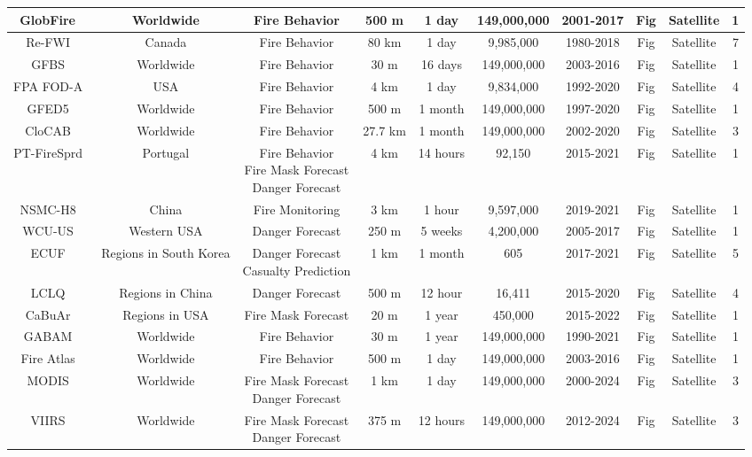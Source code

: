 \documentclass[11pt]{article}
\begin{document}
\begin{table}[htbp]
{\begin{tabular}{c|ccccccccc}
GlobFire~ & Worldwide & Fire Behavior & 500 m & 1 day & 149,000,000 & 2001-2017 & Fig & Satellite & 1 \\ \hline
Re-FWI~ & Canada & Fire Behavior & 80 km & 1 day & 9,985,000 & 1980-2018 &   Fig & Satellite & 7 \\ \hline
GFBS~ & Worldwide & Fire Behavior & 30 m & 16 days & 149,000,000 & 2003-2016 & Fig & Satellite & 1 \\ \hline
FPA FOD-A~ & USA & Fire Behavior & 4 km & 1 day & 9,834,000 & 1992-2020 &   Fig & Satellite & 4 \\ \hline
GFED5~ & Worldwide & Fire Behavior & 500 m & 1 month & 149,000,000 & 1997-2020 & Fig & Satellite & 1 \\ \hline
CloCAB~ & Worldwide & Fire Behavior & 27.7 km & 1 month & 149,000,000 & 2002-2020 & Fig & Satellite & 3 \\ \hline
PT-FireSprd~ & Portugal & \makecell{Fire Behavior\\ Fire Mask Forecast\\ Danger Forecast} & 4 km & 14 hours & 92,150 & 2015-2021 & Fig & Satellite & 1 \\ \hline
NSMC-H8~ & China & Fire Monitoring & 3 km & 1 hour & 9,597,000 & 2019-2021 & Fig & Satellite & 1 \\ \hline
WCU-US~ & Western USA & Danger Forecast & 250 m & 5 weeks & 4,200,000 & 2005-2017 & Fig & Satellite & 1 \\ \hline
ECUF~ & Regions in South Korea & \makecell{Danger Forecast\\ Casualty Prediction} & 1 km & 1 month & 605 & 2017-2021 &   Fig & Satellite & 5 \\ \hline
LCLQ~ & Regions in China & Danger Forecast & 500 m & 12 hour & 16,411 & 2015-2020 &   Fig & Satellite & 4 \\ \hline
CaBuAr~ & Regions in USA & Fire Mask Forecast & 20 m & 1 year & 450,000 & 2015-2022 & Fig & Satellite & 1 \\ \hline
GABAM~ & Worldwide & Fire Behavior & 30 m & 1 year & 149,000,000 & 1990-2021 & Fig & Satellite & 1 \\ \hline
Fire Atlas~ & Worldwide & Fire Behavior & 500 m & 1 day & 149,000,000 & 2003-2016 & Fig & Satellite & 1 \\ \hline
MODIS~ & Worldwide & \makecell{Fire Mask Forecast\\ Danger Forecast} & 1 km & 1 day & 149,000,000 & 2000-2024 &   Fig & Satellite & 3 \\ \hline
VIIRS~ & Worldwide & \makecell{Fire Mask Forecast\\ Danger Forecast} & 375 m & 12 hours & 149,000,000 & 2012-2024 &   Fig & Satellite & 3 \\ \hline

\end{tabular}}
\end{table}
\end{document}

